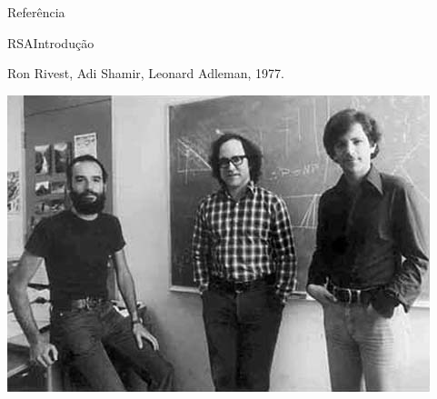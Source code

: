 \begin{frame}{Referência}

\biblioref

\end{frame}




\lecturetitle{\insertlecture}{\course}
\frame{\maketitle}

\begin{frame}{RSA}{Introdução}

Ron \alert{R}ivest, Adi \alert{S}hamir, Leonard \alert{A}dleman, 1977.

\begin{center}
\includegraphics[scale=.4]{img/rsa.png}
\end{center}

\end{frame}

